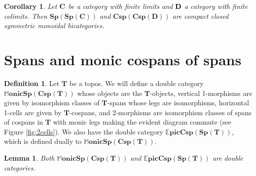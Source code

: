 \documentclass[11pt]{amsart}
\newcommand{\cat}[1]{\mathbf{#1}}
\newcommand{\bispsp}[1]{\mathbf{Sp(Sp(#1))}}
\newcommand{\bicspcsp}[1]{\mathbf{Csp(Csp(#1))}}
\newcommand{\dblmonspcsp}[1]{\mathbb{M}\mathbf{onicSp(Csp(#1))}}
\newcommand{\dblepiccspsp}[1]{\mathbb{E}\mathbf{picCsp(Sp(#1))}}
\newtheorem{lem}[thm]{Lemma}
\newtheorem{cor}[thm]{Corollary}
\theoremstyle{remark}
\theoremstyle{definition}
\newtheorem{defn}[thm]{Definition}
\begin{document}
\begin{cor}
	\label{cor:SpansSpansAreCCBicat}
	Let $\bold{C}$ be a category with finite limits and $\bold{D}$ a category with finite colimits. Then $\bispsp{C}$ and $\bicspcsp{D}$ are compact closed symmetric monoidal bicategories.
\end{cor}

\section{Spans and monic cospans of spans} %
\label{sec:SpansCospans}

\begin{defn}
\label{def:DblCatMonSpanCsp}
	Let $\cat{T}$ be a topos. We will define a double category $\dblmonspcsp{T}$ whose objects are the $\cat{T}$-objects, vertical 1-morphisms are given by isomorphism classes of $\cat{T}$-spans whose legs are isomorphisms, horizontal 1-cells are given by $\cat{T}$-cospans, and $2$-morphisms are isomorphism classes of spans of cospans in $\cat{T}$ with monic legs making the evident diagram commute (see Figure \ref{fig:2cells}). We also have the double category $\dblepiccspsp{T}$, which is defined dually to $\dblmonspcsp{T}$. 
\end{defn}

\begin{lem}
\label{lem:SpanCospanDoubleCat}
	Both $\dblmonspcsp{T}$ and $\dblepiccspsp{T}$ are double categories.  
\end{lem}
\end{document}
